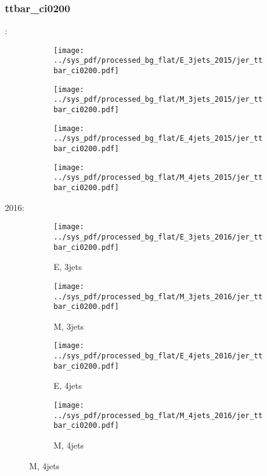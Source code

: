 \documentclass{beamer}
\begin{document}
\begin{frame}
\frametitle{ttbar_ci0200}
\fontsize{5}{1}:
\begin{figure}
\centering
\begin{subfigure}[b]{0.24\textwidth}
\texttt{[image: ../sys\_pdf/processed\_bg\_flat/E\_3jets\_2015/jer\_ttbar\_ci0200.pdf]}
\end{subfigure}
\begin{subfigure}[b]{0.24\textwidth}
\texttt{[image: ../sys\_pdf/processed\_bg\_flat/M\_3jets\_2015/jer\_ttbar\_ci0200.pdf]}
\end{subfigure}
\begin{subfigure}[b]{0.24\textwidth}
\texttt{[image: ../sys\_pdf/processed\_bg\_flat/E\_4jets\_2015/jer\_ttbar\_ci0200.pdf]}
\end{subfigure}
\begin{subfigure}[b]{0.24\textwidth}
\texttt{[image: ../sys\_pdf/processed\_bg\_flat/M\_4jets\_2015/jer\_ttbar\_ci0200.pdf]}
\end{subfigure}
\end{figure}
2016:
\begin{figure}
\centering
\begin{subfigure}[b]{0.24\textwidth}
\texttt{[image: ../sys\_pdf/processed\_bg\_flat/E\_3jets\_2016/jer\_ttbar\_ci0200.pdf]}
\captionsetup{font=tiny}
\caption{E, 3jets}
\end{subfigure}
\begin{subfigure}[b]{0.24\textwidth}
\texttt{[image: ../sys\_pdf/processed\_bg\_flat/M\_3jets\_2016/jer\_ttbar\_ci0200.pdf]}
\captionsetup{font=tiny}
\caption{M, 3jets}
\end{subfigure}
\begin{subfigure}[b]{0.24\textwidth}
\texttt{[image: ../sys\_pdf/processed\_bg\_flat/E\_4jets\_2016/jer\_ttbar\_ci0200.pdf]}
\captionsetup{font=tiny}
\caption{E, 4jets}
\end{subfigure}
\begin{subfigure}[b]{0.24\textwidth}
\texttt{[image: ../sys\_pdf/processed\_bg\_flat/M\_4jets\_2016/jer\_ttbar\_ci0200.pdf]}
\captionsetup{font=tiny}
\caption{M, 4jets}
\end{subfigure}
\end{figure}
\end{frame}
\end{document}
